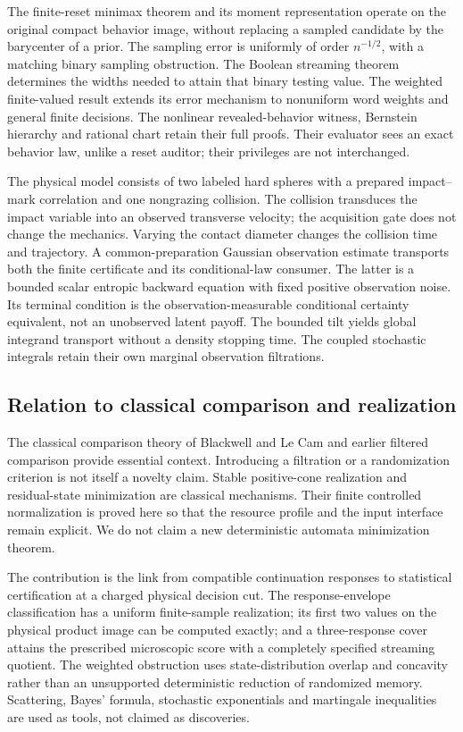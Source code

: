 The finite-reset minimax theorem and its moment representation operate on
the original compact behavior image, without replacing a sampled
candidate by the barycenter of a prior. The sampling error is uniformly
of order $n^{-1/2}$, with a matching binary sampling obstruction. The
Boolean streaming theorem determines the widths needed to attain that
binary testing value. The weighted finite-valued result extends its
error mechanism to nonuniform word weights and general finite decisions.
The nonlinear revealed-behavior witness, Bernstein hierarchy and rational
chart retain their full proofs. Their evaluator sees an exact behavior
law, unlike a reset auditor; their privileges are not interchanged.

The physical model consists of two labeled hard spheres with a prepared
impact--mark correlation and one nongrazing collision. The collision
transduces the impact variable into an observed transverse velocity;
the acquisition gate does not change the mechanics. Varying the contact
diameter changes the collision time and trajectory. A common-preparation
Gaussian observation estimate transports both the finite certificate and
its conditional-law consumer. The latter is a bounded scalar entropic
backward equation with fixed positive observation noise. Its terminal
condition is the observation-measurable conditional certainty equivalent,
not an unobserved latent payoff. The bounded tilt yields global
integrand transport without a density stopping time. The coupled
stochastic integrals retain their own marginal observation filtrations.

\subsection{Relation to classical comparison and realization}
The classical comparison theory of Blackwell and Le Cam
\cite{Blackwell1953,LeCam1964,Torgersen1991} and earlier filtered
comparison \cite{Norberg2002,Weisshaupt2006} provide essential context.
Introducing a filtration or a randomization criterion is not itself a
novelty claim. Stable positive-cone realization \cite{Fliess1975} and
residual-state minimization \cite{Nerode1958} are classical mechanisms.
Their finite controlled normalization is proved here so that the resource
profile and the input interface remain explicit. We do not claim a new
deterministic automata minimization theorem.

The contribution is the link from compatible continuation responses to
statistical certification at a charged physical decision cut. The
response-envelope classification has a uniform finite-sample realization;
its first two values on the physical product image can be computed
exactly; and a three-response cover attains the prescribed microscopic
score with a completely specified streaming quotient. The weighted
obstruction uses state-distribution overlap and concavity rather than an
unsupported deterministic reduction of randomized memory. Scattering,
Bayes' formula, stochastic exponentials and martingale inequalities are
used as tools, not claimed as discoveries.

